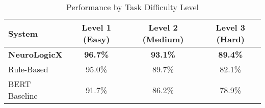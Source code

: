 
\begin{table}[htb]
\centering
\caption{Performance by Task Difficulty Level}
\label{tab:difficulty}
\begin{tabular}{lccc}
\toprule
System & Level 1 (Easy) & Level 2 (Medium) & Level 3 (Hard) \\
\midrule
\textbf{NeuroLogicX} & \textbf{96.7\%} & \textbf{93.1\%} & \textbf{89.4\%} \\
Rule-Based & 95.0\% & 89.7\% & 82.1\% \\
BERT Baseline & 91.7\% & 86.2\% & 78.9\% \\
\bottomrule
\end{tabular}
\end{table}
